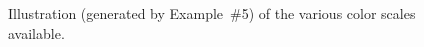 \begin{figure}[h!]
\caption{%
\label{page:merge_wmapKband}%
\label{fig:merge_wmapKband}%
Illustration (generated by 
Example~\#5)
of the various color scales available.}
\end{figure}

